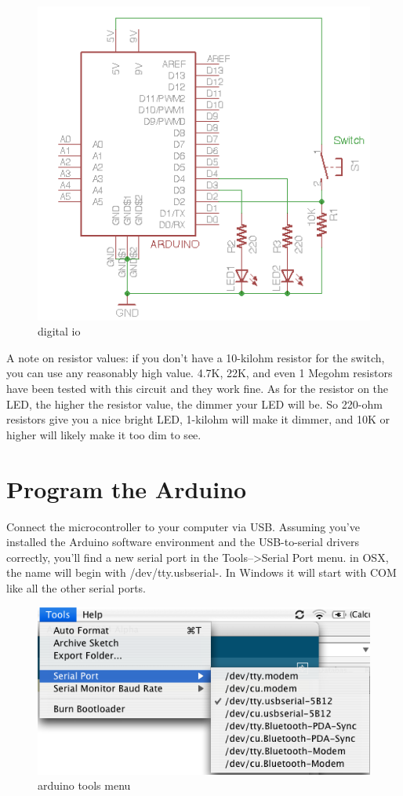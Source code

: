 \begin{figure}[!htb]
 \centering
 \includegraphics[scale=.6]{img/digitalio/digital_io.png}
 \caption{digital io}
 \label{digital io}
\end{figure}

A note on resistor values: if you don't have a 10-kilohm resistor for the switch, you can use any reasonably high value. 4.7K, 22K, and even 1 Megohm resistors have been tested with this circuit and they work fine. As for the resistor on the LED, the higher the resistor value, the dimmer your LED will be. So 220-ohm resistors give you a nice bright LED, 1-kilohm will make it dimmer, and 10K or higher will likely make it too dim to see.

\section{Program the Arduino}

Connect the microcontroller to your computer via USB. Assuming you've installed the Arduino software environment and the USB-to-serial drivers correctly, you'll find a new serial port in the Tools-->Serial Port menu. in OSX, the name will begin with /dev/tty.usbserial-. In Windows it will start with COM like all the other serial ports.

\begin{figure}[!htb]
 \centering
 \includegraphics[scale=0.6]{img/digitalio/arduino_tools_menu.png}
 \caption{arduino tools menu}
 \label{arduino tools menu}
\end{figure}

